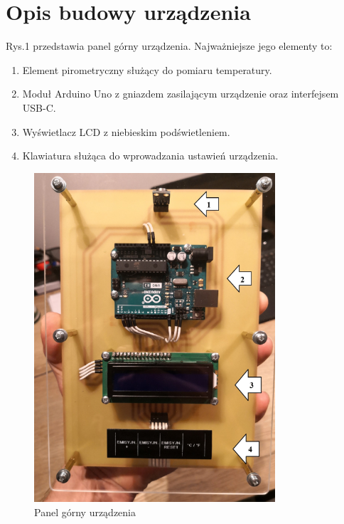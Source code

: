 \section{Opis budowy urządzenia}

Rys.1 przedstawia panel górny urządzenia. Najważniejsze jego elementy to:

\begin{enumerate}
    
    \item Element pirometryczny służący do pomiaru temperatury.
    
    \item Moduł Arduino Uno z gniazdem zasilającym urządzenie oraz interfejsem USB-C.
    
    \item Wyświetlacz LCD z niebieskim podświetleniem.
    
    \item Klawiatura służąca do wprowadzania ustawień urządzenia.

\end{enumerate}

\begin{figure}[h!]
    \centering
    \includegraphics[width=0.8\textwidth]{images/gpanel.png}
    \caption{Panel górny urządzenia}
    \label{fig:panel_gorny}
\end{figure}

